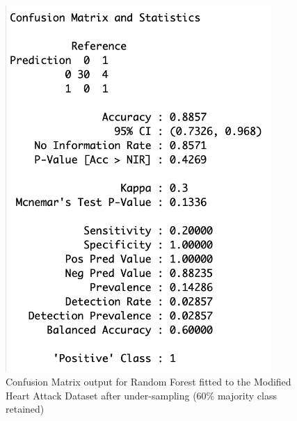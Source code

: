 \begin{figure}[!htbp]
    \centering
    \begin{minipage}{0.45\textwidth}
        \centering
        \includegraphics[width=0.9\textwidth]{ThesisTemplate/appendix/images/Chapter5Appendix/ConfusionMatrix60/modHA.png}
        \caption{Confusion Matrix output for Random Forest fitted to the Modified Heart Attack Dataset after under-sampling (60\% majority class retained)}
        \label{fig:my_label}
    \end{minipage}\hfill
    \begin{minipage}{0.45\textwidth}
        \centering

\end{minipage}
\end{figure}
